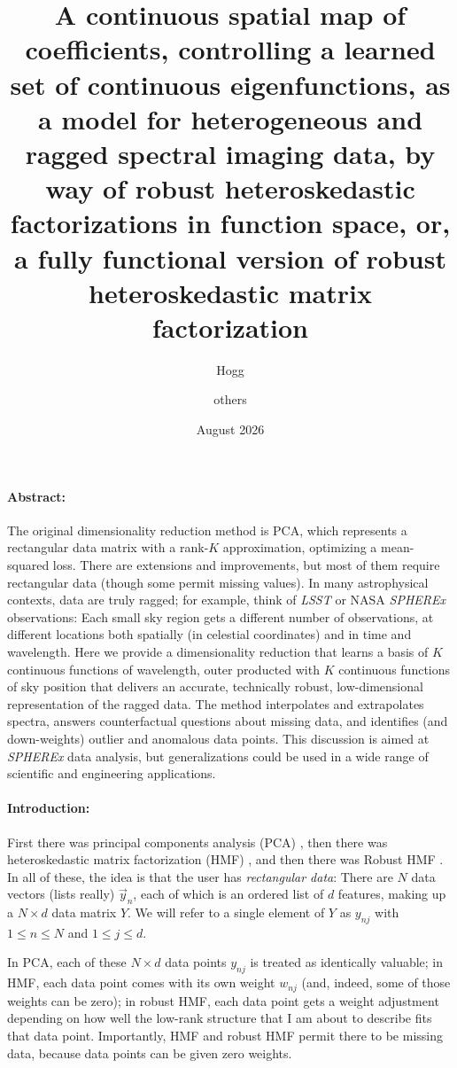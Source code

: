 \documentclass{article}
\title{\bfseries A continuous spatial map of coefficients, controlling a learned set of continuous eigenfunctions, as a model for heterogeneous and ragged spectral imaging data, by way of robust heteroskedastic factorizations in function space, or, a fully functional version of robust heteroskedastic matrix factorization}
\author{Hogg \and others}
\date{August 2026}
\begin{document}
\maketitle

\paragraph{Abstract:}
The original dimensionality reduction method is PCA, which represents a rectangular data matrix with a rank-$K$ approximation, optimizing a mean-squared loss.
There are extensions and improvements, but most of them require rectangular data (though some permit missing values).
In many astrophysical contexts, data are truly ragged; for example,
think of \textsl{LSST} or NASA \textsl{SPHEREx} observations:
Each small sky region gets a different number of observations, at different locations both spatially (in celestial coordinates) and in time and wavelength.
Here we provide a dimensionality reduction that learns a basis of $K$ continuous functions of wavelength, outer producted with $K$ continuous functions of sky position that delivers an accurate, technically robust, low-dimensional representation of the ragged data.
The method interpolates and extrapolates spectra, answers counterfactual questions about missing data, and identifies (and down-weights) outlier and anomalous data points.
This discussion is aimed at \textsl{SPHEREx} data analysis, but generalizations could be used in a wide range of scientific and engineering applications.

\paragraph{Introduction:}
First there was principal components analysis (PCA) \cite{pca},
then there was heteroskedastic matrix factorization (HMF) \cite{hmf},
and then there was Robust HMF \cite{rhmf}.
In all of these, the idea is that the user has \emph{rectangular data}:
There are $N$ data vectors (lists really) $\vec{y}_n$, each of which is an ordered list of $d$ features, making up a $N\times d$ data matrix $Y$.
We will refer to a single element of $Y$ as $y_{nj}$ with $1\leq n\leq N$ and $1\leq j\leq d$.

In PCA, each of these $N\times d$ data points $y_{nj}$ is treated as identically valuable;
in HMF, each data point comes with its own weight $w_{nj}$ (and, indeed, some of those weights can be zero);
in robust HMF, each data point gets a weight adjustment depending on how well the low-rank structure that I am about to describe fits that data point.
Importantly, HMF and robust HMF permit there to be missing data, because data points can be given zero weights.
\end{document}
